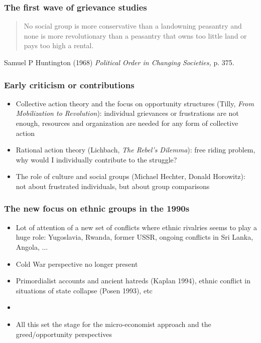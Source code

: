 \documentclass[aspectratio=43]{beamer}
\begin{document}
\begin{frame}
\frametitle{The first wave of grievance studies}
\centering

\begin{quote}
No social group is more conservative than a landowning peasantry and none is more revolutionary than a peasantry that owns too little land or pays too high a rental.
\end{quote}

\vspace{10pt}

{\footnotesize Samuel P Huntington (1968) \textit{Political Order in Changing Societies,} p. 375.}

\end{frame}

\begin{frame}
\frametitle{Early criticism or contributions}
\centering

\begin{itemize}
  \item Collective action theory and the focus on opportunity structures (Tilly, \textit{From Mobilization to Revolution}): individual grievances or frustrations are not enough, resources and organization are needed for any form of collective action
  \item<2-> Rational action theory (Lichbach, \textit{The Rebel's Dilemma}): free riding problem, why would I individually contribute to the struggle?
  \item<3-> The role of culture and social groups (Michael Hechter, Donald Horowitz): not about frustrated individuals, but about group comparisons
\end{itemize}

\end{frame}

\begin{frame}
\frametitle{The new focus on ethnic groups in the 1990s}
\centering

\begin{itemize}
  \item Lot of attention of a new set of conflicts where ethnic rivalries seems to play a huge role: Yugoslavia, Rwanda, former USSR, ongoing conflicts in Sri Lanka, Angola, ...
  \item Cold War perspective no longer present
  \item Primordialist accounts and ancient hatreds (Kaplan 1994), ethnic conflict in situations of state collapse (Posen 1993), etc
  \item[]
  \item All this set the stage for the micro-economist approach and the greed/opportunity perspectives
\end{itemize}

\end{frame}
\end{document}
